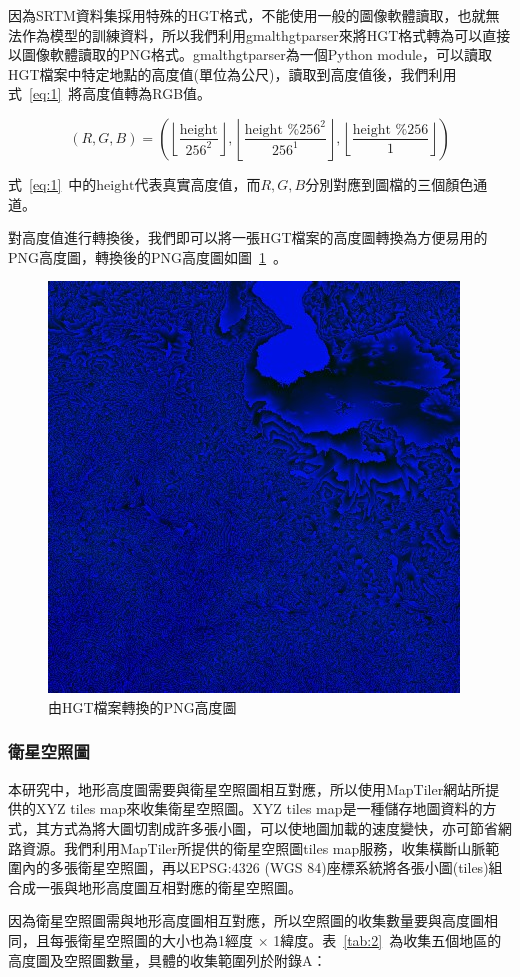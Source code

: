 \documentclass[a4paper, 12pt]{article}
\begin{document}
因為SRTM資料集採用特殊的HGT格式，不能使用一般的圖像軟體讀取，也就無法作為模型的訓練資料，所以我們利用gmalthgtparser來將HGT格式轉為可以直接以圖像軟體讀取的PNG格式。gmalthgtparser為一個Python module，可以讀取HGT檔案中特定地點的高度值(單位為公尺)，讀取到高度值後，我們利用式~\ref{eq:1}~將高度值轉為RGB值。

\begin{equation}
    (R, G, B)=\left(\left\lfloor\frac{\text {height}}{256^{2}}\right\rfloor,\left\lfloor\frac{\text {height } \% 256^{2}}{256^{1}}\right\rfloor,\left\lfloor\frac{\text {height } \% 256}{1}\right\rfloor\right)
    \label{eq:1}
\end{equation}

式~\ref{eq:1}~中的$\text{height}$代表真實高度值，而$R,G,B$分別對應到圖檔的三個顏色通道。

對高度值進行轉換後，我們即可以將一張HGT檔案的高度圖轉換為方便易用的PNG高度圖，轉換後的PNG高度圖如圖~\ref{fig:7}~。

\begin{figure}[htbp]
    \centering
    \includegraphics[width=0.45\linewidth]{fig/7.jpg}
    \caption{由HGT檔案轉換的PNG高度圖}
    \label{fig:7}
\end{figure}

\subsubsection{衛星空照圖}
本研究中，地形高度圖需要與衛星空照圖相互對應，所以使用MapTiler網站所提供的XYZ tiles map來收集衛星空照圖。XYZ tiles map是一種儲存地圖資料的方式，其方式為將大圖切割成許多張小圖，可以使地圖加載的速度變快，亦可節省網路資源。我們利用MapTiler所提供的衛星空照圖tiles map服務，收集橫斷山脈範圍內的多張衛星空照圖，再以EPSG:4326 (WGS 84)座標系統將各張小圖(tiles)組合成一張與地形高度圖互相對應的衛星空照圖。

因為衛星空照圖需與地形高度圖相互對應，所以空照圖的收集數量要與高度圖相同，且每張衛星空照圖的大小也為1經度 $\times$ 1緯度。表~\ref{tab:2}~為收集五個地區的高度圖及空照圖數量，具體的收集範圍列於附錄A：
\end{document}
